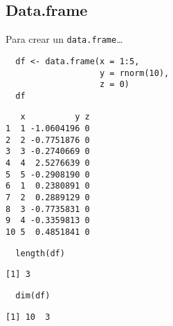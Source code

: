 \documentclass[xcolor={usenames,svgnames,dvipsnames}]{beamer}
\begin{document}
\subsection{Data.frame}
\label{sec:orgffe350a}
\begin{frame}[fragile,label={sec:orge2c6a14}]{Para crear un \texttt{data.frame}\ldots{}}
 \lstset{language=r,label= ,caption= ,captionpos=b,numbers=none}
\begin{lstlisting}
  df <- data.frame(x = 1:5,
                   y = rnorm(10),
                   z = 0)
  df
\end{lstlisting}

\begin{verbatim}
   x          y z
1  1 -1.0604196 0
2  2 -0.7751876 0
3  3 -0.2740669 0
4  4  2.5276639 0
5  5 -0.2908190 0
6  1  0.2380891 0
7  2  0.2889129 0
8  3 -0.7735831 0
9  4 -0.3359813 0
10 5  0.4851841 0
\end{verbatim}

\lstset{language=r,label= ,caption= ,captionpos=b,numbers=none}
\begin{lstlisting}
  length(df)
\end{lstlisting}

\begin{verbatim}
[1] 3
\end{verbatim}

\lstset{language=r,label= ,caption= ,captionpos=b,numbers=none}
\begin{lstlisting}
  dim(df)
\end{lstlisting}

\begin{verbatim}
[1] 10  3
\end{verbatim}
\end{frame}
\end{document}
